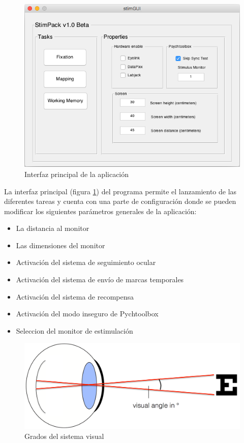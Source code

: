 \documentclass[conference]{IEEEtran}
\begin{document}
\begin{figure}[htbp]
\centerline{\includegraphics[width=\linewidth]{figures/main_gui}}
\caption{Interfaz principal de la aplicación}
\label{figmainGUI}
\end{figure}

La interfaz principal (figura \ref{figmainGUI}) del programa permite el lanzamiento de las diferentes tareas y cuenta con una parte de configuración donde se pueden modificar los siguientes parámetros generales de la aplicación:
\begin{itemize}
	\item La distancia al monitor
	\item Las dimensiones del monitor
	\item Activación del sistema de seguimiento ocular
	\item Activación del sistema de envío de marcas temporales
	\item Activación del sistema de recompensa
	\item Activación del modo inseguro de Pychtoolbox
	\item Seleccion del monitor de estimulación
\end{itemize} 

\begin{figure}[htbp]
\centerline{\includegraphics[width=\linewidth]{figures/visual_degrees}}
\caption{Grados del sistema visual}
\label{figvisualDegrees}
\end{figure}
\end{document}
